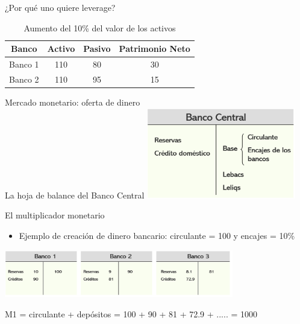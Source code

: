 \documentclass{beamer}
\begin{document}
\begin{frame}{¿Por qué uno quiere leverage?}
\begin{table}[H]
    \centering
    \begin{tabular}{|c|c|c|c|}
    \hline
\textbf{Banco}    & \textbf{Activo} & \textbf{Pasivo} & \textbf{Patrimonio Neto}\\
         \hline \hline
         Banco 1 &  110 &  80 & 30\\[1mm]
        \hline
       Banco 2 & 110  &  95& 15\\[1mm]
        \hline
    \end{tabular}
    \caption{Aumento del 10\% del valor de los activos}
    \label{caida10pp}
\end{table}
\end{frame}

\begin{frame}{Mercado monetario: oferta de dinero \\ La hoja de balance del Banco Central }
\centering\includegraphics[width=6.5cm]{Figures/P48.png}\
\end{frame}


\begin{frame}{El multiplicador monetario}
    \begin{itemize}
        \item Ejemplo de creación de dinero bancario:  circulante = 100  y  encajes = 10\%
    \end{itemize}

    \vspace{2mm}
    
    \centering\includegraphics[width=10cm]{Figures/P50.png}\
    
    \vspace{2mm}
    
    \begin{tcolorbox}[width=4in, interior hidden, boxsep=0pt,
                  left=0pt, halign=center, valign=center, right=0pt,
                  bottom=3pt, top=3pt, ]%
                 \footnotesize{M1 = circulante + depósitos = 100 + 90 + 81 + 72.9 + ..... = 1000}
    \end{tcolorbox}
    \vspace{2mm}
\end{frame}
\end{document}
